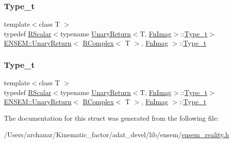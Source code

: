 \subsubsection{\texorpdfstring{Type\_t}{Type\_t}\hspace{0.1cm}{\footnotesize\ttfamily [1/2]}}
{\footnotesize\ttfamily template$<$class T $>$ \\
typedef \mbox{\hyperlink{classENSEM_1_1RScalar}{R\+Scalar}}$<$typename \mbox{\hyperlink{structENSEM_1_1UnaryReturn}{Unary\+Return}}$<$T, \mbox{\hyperlink{structENSEM_1_1FnImag}{Fn\+Imag}}$>$\+::\mbox{\hyperlink{structENSEM_1_1UnaryReturn_3_01RComplex_3_01T_01_4_00_01FnImag_01_4_a5e8cda9513c7e5cb0b7182122bd82513}{Type\+\_\+t}}$>$ \mbox{\hyperlink{structENSEM_1_1UnaryReturn}{E\+N\+S\+E\+M\+::\+Unary\+Return}}$<$ \mbox{\hyperlink{classENSEM_1_1RComplex}{R\+Complex}}$<$ T $>$, \mbox{\hyperlink{structENSEM_1_1FnImag}{Fn\+Imag}} $>$\+::\mbox{\hyperlink{structENSEM_1_1UnaryReturn_3_01RComplex_3_01T_01_4_00_01FnImag_01_4_a5e8cda9513c7e5cb0b7182122bd82513}{Type\+\_\+t}}}

\mbox{\label{structENSEM_1_1UnaryReturn_3_01RComplex_3_01T_01_4_00_01FnImag_01_4_a5e8cda9513c7e5cb0b7182122bd82513}} 
\subsubsection{\texorpdfstring{Type\_t}{Type\_t}\hspace{0.1cm}{\footnotesize\ttfamily [2/2]}}
{\footnotesize\ttfamily template$<$class T $>$ \\
typedef \mbox{\hyperlink{classENSEM_1_1RScalar}{R\+Scalar}}$<$typename \mbox{\hyperlink{structENSEM_1_1UnaryReturn}{Unary\+Return}}$<$T, \mbox{\hyperlink{structENSEM_1_1FnImag}{Fn\+Imag}}$>$\+::\mbox{\hyperlink{structENSEM_1_1UnaryReturn_3_01RComplex_3_01T_01_4_00_01FnImag_01_4_a5e8cda9513c7e5cb0b7182122bd82513}{Type\+\_\+t}}$>$ \mbox{\hyperlink{structENSEM_1_1UnaryReturn}{E\+N\+S\+E\+M\+::\+Unary\+Return}}$<$ \mbox{\hyperlink{classENSEM_1_1RComplex}{R\+Complex}}$<$ T $>$, \mbox{\hyperlink{structENSEM_1_1FnImag}{Fn\+Imag}} $>$\+::\mbox{\hyperlink{structENSEM_1_1UnaryReturn_3_01RComplex_3_01T_01_4_00_01FnImag_01_4_a5e8cda9513c7e5cb0b7182122bd82513}{Type\+\_\+t}}}



The documentation for this struct was generated from the following file\+:\begin{DoxyCompactItemize}
\item 
/\+Users/archanar/\+Kinematic\+\_\+factor/adat\+\_\+devel/lib/ensem/\mbox{\hyperlink{lib_2ensem_2ensem__reality_8h}{ensem\+\_\+reality.\+h}}\end{DoxyCompactItemize}
